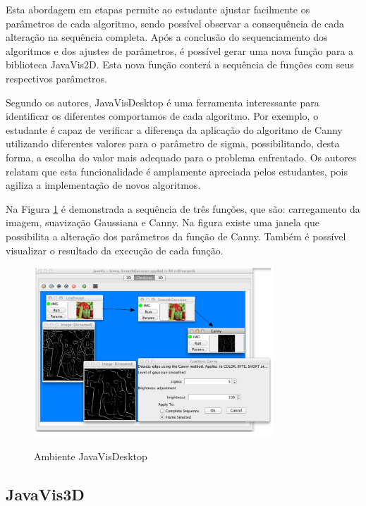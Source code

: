 \documentclass[
	12pt,				%
	oneside,			%
	a4paper,			%
	english,			%
	french,				%
	spanish,			%
	brazil,				%
	]{abntex2}
\begin{document}
Esta abordagem em etapas permite ao estudante ajustar facilmente os parâmetros de cada algoritmo, sendo possível observar a consequência de cada alteração na sequência completa. Após a conclusão do sequenciamento dos algoritmos e dos ajustes de parâmetros, é possível gerar uma nova função para a biblioteca JavaVis2D. Esta nova função conterá a sequência de funções com seus respectivos parâmetros.

Segundo os autores, JavaVisDesktop é uma ferramenta interessante para identificar os diferentes comportamos de cada algoritmo. Por exemplo, o estudante é capaz de verificar a diferença da aplicação do algoritmo de Canny utilizando diferentes valores para o parâmetro de sigma, possibilitando, desta forma, a escolha do valor mais adequado para o problema enfrentado. Os autores relatam que esta funcionalidade é amplamente apreciada pelos estudantes, pois agiliza a implementação de novos algoritmos.

Na Figura \ref{fig:javavis_desktop} é demonstrada a sequência de três funções, que são: carregamento da imagem, suavização Gaussiana e Canny. Na figura existe uma janela que possibilita a alteração dos parâmetros da função de Canny. Também é possível visualizar o resultado da execução de cada função.

\begin{figure}[ht]
\centering
\caption{Ambiente JavaVisDesktop}
\includegraphics[width=0.8\textwidth]{imagens/javavis_desktop.png}
\label{fig:javavis_desktop}
\end{figure}

\subsection{JavaVis3D}
\end{document}
